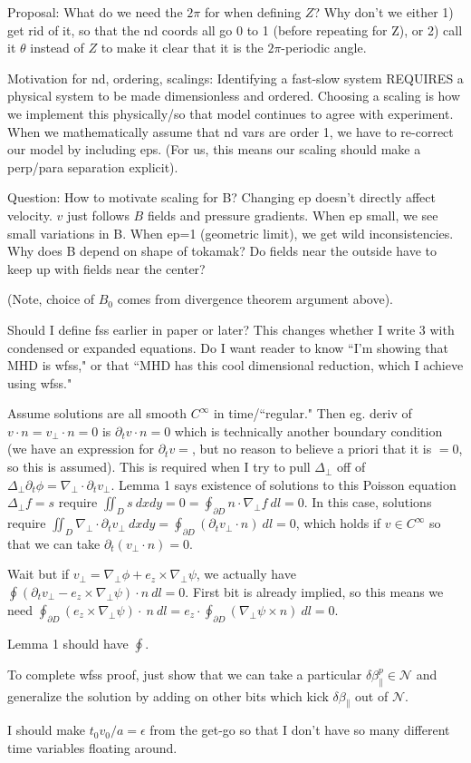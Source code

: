 \documentclass{article}
\newcommand{\para}{\parallel}
\newcommand{\ep}{\epsilon}
\newcommand{\np}{\nabla_\perp}
\newcommand{\lap}{\Delta_\perp}
\newcommand{\p}{\partial}
\begin{document}
Proposal: What do we need the $2\pi$ for when defining $Z$? Why don't we either 1) get rid of it, so that the nd coords all go 0 to 1 (before repeating for Z), or 2) call it $\theta$ instead of $Z$ to make it clear that it is the $2\pi$-periodic angle. 

Motivation for nd, ordering, scalings: Identifying a fast-slow system REQUIRES a physical system to be made dimensionless and ordered. Choosing a scaling is how we implement this physically/so that model continues to agree with experiment. When we mathematically assume that nd vars are order 1, we have to re-correct our model by including eps. (For us, this means our scaling should make a perp/para separation explicit). 

Question: How to motivate scaling for B? Changing ep doesn't directly affect velocity. $v$ just follows $B$ fields and pressure gradients. 
When ep small, we see small variations in B. When ep=1 (geometric limit), we get wild inconsistencies. Why does B depend on shape of tokamak? Do fields near the outside have to keep up with fields near the center? 

(Note, choice of $B_0$ comes from divergence theorem argument above). 

Should I define fss earlier in paper or later? This changes whether I write 3 with condensed or expanded equations. Do I want reader to know ``I'm showing that MHD is wfss," or that ``MHD has this cool dimensional reduction, which I achieve using wfss." 

Assume solutions are all smooth $C^\infty$ in time/``regular." Then eg. deriv of $v\cdot n=v_\perp\cdot n=0$ is $\p_t v\cdot n=0$ which is technically another boundary condition (we have an expression for $\p_t v=$, but no reason to believe a priori that it is $=0$, so this is assumed). This is required when I try to pull $\lap$ off of $\lap\p_t\phi = \np\cdot\p_tv_\perp$. Lemma 1 says existence of solutions to this Poisson equation $\lap f=s$ require $\iint_D s\ dxdy=0 = \oint_{\p D} n\cdot\np f\ dl =0$. In this case, solutions require $\iint_D \np\cdot\p_t v_\perp\ dxdy = \oint_{\p D} (\p_tv_\perp \cdot n)\ dl =0$, which holds if $v\in C^\infty$ so that we can take $\p_t (v_\perp \cdot n) = 0$. 

Wait but if $v_\perp=\np\phi + e_z\times\np\psi$, we actually have $\oint (\p_tv_\perp - e_z\times\np\psi) \cdot n\ dl =0$. First bit is already implied, so this means we need $\oint_{\p D} (e_z\times\np\psi)\cdot\ n\ dl= e_z\cdot \oint_{\p D} (\np\psi\times n)\ dl =0$. 

Lemma 1 should have $\oint$.

To complete wfss proof, just show that we can take a particular $\delta\beta_\para^p\in\mathcal{N}$ and generalize the solution by adding on other bits which kick $\delta\beta_\para$ out of $\mathcal{N}$. 

I should make $t_0v_0/a=\ep$ from the get-go so that I don't have so many different time variables floating around. 
\end{document}
